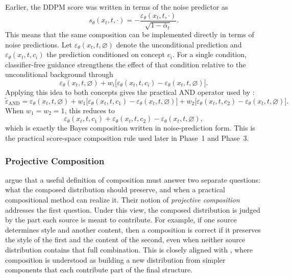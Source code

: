 Earlier, the DDPM score was written in terms of the noise predictor as
\[
    s_\theta(x_t,t,\cdot)
    =
    -\frac{\varepsilon_\theta(x_t,t,\cdot)}{\sqrt{1-\bar\alpha_t}}.
\]
This means that the same composition can be implemented directly in terms of noise
predictions. Let \(\varepsilon_\theta(x_t,t,\varnothing)\) denote the unconditional
prediction and \(\varepsilon_\theta(x_t,t,c_i)\) the prediction conditioned on concept
\(c_i\). For a single condition, classifier-free guidance strengthens the effect of that
condition relative to the unconditional background through
\[
    \varepsilon_\theta(x_t,t,\varnothing)
    +
    w_i\bigl[\varepsilon_\theta(x_t,t,c_i)-\varepsilon_\theta(x_t,t,\varnothing)\bigr].
\]
Applying this idea to both concepts gives the practical AND operator used by
\citet{liu2022compositional}:
\begin{equation}
    \tilde\varepsilon_{\mathrm{AND}}
    =
    \varepsilon_\theta(x_t,t,\varnothing)
    +
    w_1\bigl[\varepsilon_\theta(x_t,t,c_1)-\varepsilon_\theta(x_t,t,\varnothing)\bigr]
    +
    w_2\bigl[\varepsilon_\theta(x_t,t,c_2)-\varepsilon_\theta(x_t,t,\varnothing)\bigr].
    \label{eq:and_operator}
\end{equation}
When \(w_1=w_2=1\), this reduces to
\[
    \varepsilon_\theta(x_t,t,c_1)
    +
    \varepsilon_\theta(x_t,t,c_2)
    -
    \varepsilon_\theta(x_t,t,\varnothing),
\]
which is exactly the Bayes composition written in noise-prediction form. This is the
practical score-space composition rule used later in Phase~1 and Phase~3.



\subsubsection{Projective Composition}
\label{subsec:bg_projective}

\citet{mechanisms2025projective} argue that a useful definition of composition must answer
two separate questions: what the composed distribution should preserve, and when a practical
compositional method can realize it. Their notion of \emph{projective composition} addresses
the first question. Under this view, the composed distribution is judged by the part each
source is meant to contribute. For example, if one source determines style and another
content, then a composition is correct if it preserves the style of the first and the
content of the second, even when neither source distribution contains that full combination.
This is closely aligned with \citet{du2024compositional}, where composition is understood as
building a new distribution from simpler components that each contribute part of the final
structure.

